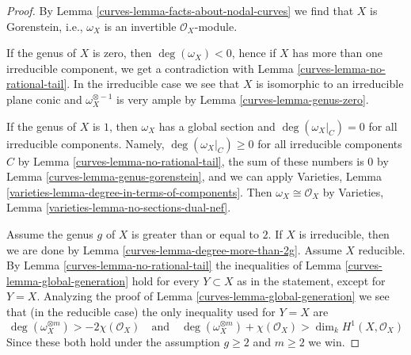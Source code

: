 \begin{proof}

By Lemma \ref{curves-lemma-facts-about-nodal-curves} we find that $X$ is
Gorenstein, i.e., $\omega_X$ is an invertible $\mathcal{O}_X$-module.

\medskip\noindent
If the genus of $X$ is zero, then $\deg(\omega_X) < 0$, hence if
$X$ has more than one irreducible component, we get a contradiction
with Lemma \ref{curves-lemma-no-rational-tail}. In the irreducible case
we see that $X$ is isomorphic to an irreducible plane conic and
$\omega_X^{\otimes -1}$ is very ample by Lemma \ref{curves-lemma-genus-zero}.

\medskip\noindent
If the genus of $X$ is $1$, then $\omega_X$ has a global section and
$\deg(\omega_X|_C) = 0$ for all irreducible components.
Namely, $\deg(\omega_X|_C) \geq 0$ for all irreducible components $C$
by Lemma \ref{curves-lemma-no-rational-tail}, the sum of these numbers is
$0$ by Lemma \ref{curves-lemma-genus-gorenstein}, and we can apply
Varieties, Lemma \ref{varieties-lemma-degree-in-terms-of-components}.
Then $\omega_X \cong \mathcal{O}_X$ by
Varieties, Lemma \ref{varieties-lemma-no-sections-dual-nef}.

\medskip\noindent
Assume the genus $g$ of $X$ is greater than or equal to $2$.
If $X$ is irreducible, then we are done by
Lemma \ref{curves-lemma-degree-more-than-2g}.
Assume $X$ reducible.
By Lemma \ref{curves-lemma-no-rational-tail} the
inequalities of Lemma \ref{curves-lemma-global-generation}
hold for every $Y \subset X$ as in the statement, except for
$Y = X$. Analyzing the proof of Lemma \ref{curves-lemma-global-generation}
we see that (in the reducible case) the only inequality
used for $Y = X$ are
$$
\deg(\omega_X^{\otimes m}) > -2 \chi(\mathcal{O}_X)
\quad\text{and}\quad
\deg(\omega_X^{\otimes m}) + \chi(\mathcal{O}_X) > \dim_k H^1(X, \mathcal{O}_X)
$$
Since these both hold under the assumption $g \geq 2$ and $m \geq 2$ we win.
\end{proof}

